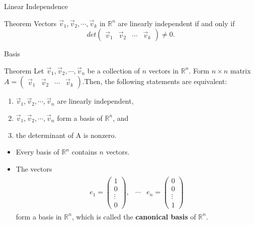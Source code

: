 \documentclass{beamer}
\begin{document}
\begin{frame}{Linear Independence}
\begin{block}{Theorem}
Vectors $\vec{v}_1,\vec{v}_2,\cdots, \vec{v}_k$ in $\mathbb{R}^n$ are linearly independent if and only if
\[det\begin{pmatrix}
\vec{v}_1 &\vec{v}_2 & \cdots & \vec{v}_k \end{pmatrix}\neq 0.
\]
\end{block}
\end{frame}

\begin{frame}{Basis}
\begin{block}{Theorem}
Let $\vec{v}_1,\vec{v}_2,\cdots, \vec{v}_n$ be a collection of $n$ vectors in $\mathbb{R}^n$. Form $n\times n $ matrix $A=\begin{pmatrix}
\vec{v}_1 &\vec{v}_2 & \cdots & \vec{v}_k \end{pmatrix}$.Then, the following statements are equivalent:
\begin{enumerate}
    \item $\vec{v}_1,\vec{v}_2,\cdots, \vec{v}_n$ are linearly independent, 
    \item $\vec{v}_1,\vec{v}_2,\cdots, \vec{v}_n$ form a basis of $\mathbb{R}^n$, and
    \item the determinant of A is nonzero.
\end{enumerate}
\end{block}
\begin{itemize}
    \item Every basis of $\mathbb{R}^n$ contains $n$ vectors. 
    \item The vectors   
    \begin{align*}
        \begin{array}{ccc}
           e_1 =\begin{pmatrix}
           1\\ 0\\ \vdots \\0
           \end{pmatrix},& \cdots   
             & e_n =\begin{pmatrix}
           0\\ 0\\ \vdots \\1
           \end{pmatrix}
        \end{array}
    \end{align*}
    form a basis in $\mathbb{R}^n$, which is called the \textbf{canonical basis} of $\mathbb{R}^n$.
\end{itemize}
\end{frame}
\end{document}
